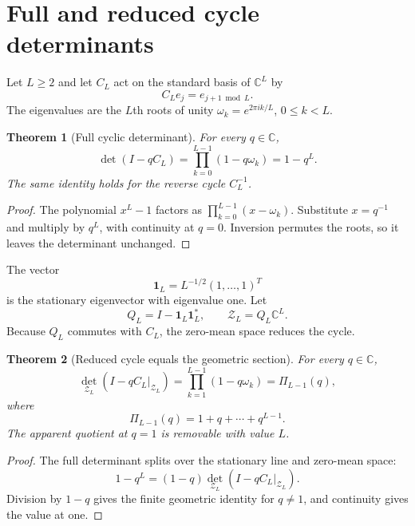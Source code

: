 \documentclass[12pt]{article}
\newtheorem{theorem}{Theorem}[section]
\theoremstyle{remark}
\newcommand{\cZ}{\mathcal Z}
\begin{document}
\section{Full and reduced cycle determinants}

Let $L\ge2$ and let $C_L$ act on the standard basis of $\mathbb C^L$ by
\begin{equation}\label{eq:cycle}
 C_Le_j=e_{j+1\bmod L}.
\end{equation}
The eigenvalues are the $L$th roots of unity
$\omega_k=e^{2\pi ik/L}$, $0\le k<L$.

\begin{theorem}[Full cyclic determinant]\label{thm:full}
For every $q\in\mathbb C$,
\begin{equation}\label{eq:full-det}
 \det(I-qC_L)=\prod_{k=0}^{L-1}(1-q\omega_k)=1-q^L.
\end{equation}
The same identity holds for the reverse cycle $C_L^{-1}$.
\end{theorem}

\begin{proof}
The polynomial $x^L-1$ factors as
$\prod_{k=0}^{L-1}(x-\omega_k)$.  Substitute $x=q^{-1}$ and multiply by
$q^L$, with continuity at $q=0$.  Inversion permutes the roots, so it leaves
the determinant unchanged.
\end{proof}

The vector
\[
 \mathbf1_L=L^{-1/2}(1,\ldots,1)^T
\]
is the stationary eigenvector with eigenvalue one.  Let
\[
 Q_L=I-\mathbf1_L\mathbf1_L^*,
 \qquad \cZ_L=Q_L\mathbb C^L.
\]
Because $Q_L$ commutes with $C_L$, the zero-mean space reduces the cycle.

\begin{theorem}[Reduced cycle equals the geometric section]
\label{thm:reduced}
For every $q\in\mathbb C$,
\begin{equation}\label{eq:geometric}
 \det_{\cZ_L}(I-qC_L|_{\cZ_L})
 =\prod_{k=1}^{L-1}(1-q\omega_k)
 =\Pi_{L-1}(q),
\end{equation}
where
\[
 \Pi_{L-1}(q)=1+q+\cdots+q^{L-1}.
\]
The apparent quotient at $q=1$ is removable with value $L$.
\end{theorem}

\begin{proof}
The full determinant splits over the stationary line and zero-mean space:
\[
 1-q^L=(1-q)
 \det_{\cZ_L}(I-qC_L|_{\cZ_L}).
\]
Division by $1-q$ gives the finite geometric identity for $q\ne1$, and
continuity gives the value at one.
\end{proof}
\end{document}
